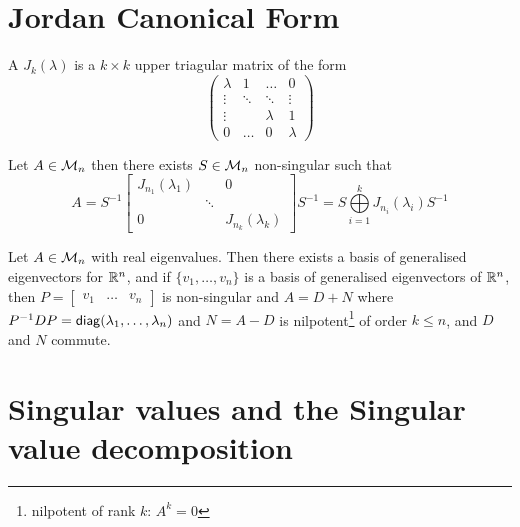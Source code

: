 \documentclass[aspectratio=169]{beamer}
\begin{document}
\section{Jordan Canonical Form}

\begin{frame}
\begin{definition}
A  $J_k(\lambda)$ is a $k\times k$ upper triagular matrix of the form \[\begin{pmatrix}
\lambda& 1& \ldots &0\\
\vdots& \ddots& \ddots&\vdots\\
\vdots& & \lambda& 1\\
0&\ldots & 0& \lambda
\end{pmatrix}\]
\end{definition}
\end{frame}


\begin{frame}
\begin{theorem}
Let $A\in \mathcal{M}_n$ then there exists $S\in \mathcal{M}_n$ non-singular such that 
\[A= S^{-1} \begin{bmatrix}
J_{n_1}(\lambda_1)& & 0\\
&  \ddots& \\
0 & &J_{n_k}(\lambda_k)
\end{bmatrix}S^{-1}= S \bigoplus\limits_{i=1}^k J_{n_i}(\lambda_i) S^{-1}\]
\end{theorem}
\vfill
\begin{theorem}
Let $A\in \mathcal{M}_n$ with real eigenvalues. Then there exists a basis of generalised eigenvectors for $\mathbb{R}^n$, and if $\{v_1, \ldots, v_n\}$ is a basis of generalised eigenvectors of $\mathbb{R}^n$, then $P= \begin{bmatrix}
v_1& \ldots & v_n
\end{bmatrix}$ is non-singular and $A=D+N$ where $P^{-1}DP= \mathsf{diag}(\lambda_1, \ldots, \lambda_n)$ and $N=A-D$ is nilpotent\footnote{nilpotent of rank $k$: $A^k=0$} of order $k\leq n$, and $D$ and $N$ commute.
\end{theorem}
\end{frame}


\section{Singular values and the Singular value decomposition}
\label{sec:SVD}
\end{document}
